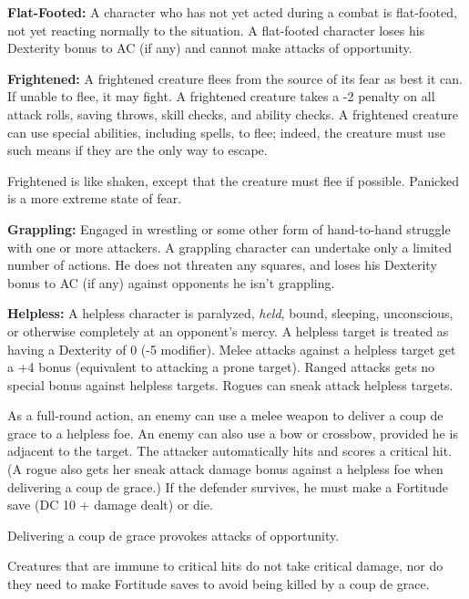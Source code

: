 \documentclass{article}
\begin{document}
\vspace{12pt}
\textbf{Flat-Footed:} A character who has not yet acted during a combat is flat-footed, 
not yet reacting normally to the situation. A flat-footed character loses his Dexterity 
bonus to AC (if any) and cannot make attacks of opportunity. 

\vspace{12pt}
\textbf{Frightened:} A frightened creature flees from the source of its fear as 
best it can. If unable to flee, it may fight. A frightened creature takes a -2 
penalty on all attack rolls, saving throws, skill checks, and ability checks. A 
frightened creature can use special abilities, including spells, to flee; indeed, 
the creature must use such means if they are the only way to escape. 

Frightened is like shaken, except that the creature must flee if possible. Panicked 
is a more extreme state of fear.

\vspace{12pt}
\textbf{Grappling:} Engaged in wrestling or some other form of hand-to-hand struggle 
with one or more attackers. A grappling character can undertake only a limited 
number of actions. He does not threaten any squares, and loses his Dexterity bonus 
to AC (if any) against opponents he isn't grappling.

\vspace{12pt}
\textbf{Helpless:} A helpless character is paralyzed, \textit{held}, bound, sleeping, 
unconscious, or otherwise completely at an opponent's mercy. A helpless target 
is treated as having a Dexterity of 0 (-5 modifier). Melee attacks against a helpless 
target get a +4 bonus (equivalent to attacking a prone target). Ranged attacks 
gets no special bonus against helpless targets. Rogues can sneak attack helpless 
targets. 

As a full-round action, an enemy can use a melee weapon to deliver a coup de grace 
to a helpless foe. An enemy can also use a bow or crossbow, provided he is adjacent 
to the target. The attacker automatically hits and scores a critical hit. (A rogue 
also gets her sneak attack damage bonus against a helpless foe when delivering 
a coup de grace.) If the defender survives, he must make a Fortitude save (DC 10 
+ damage dealt) or die. 

Delivering a coup de grace provokes attacks of opportunity. 

Creatures that are immune to critical hits do not take critical damage, nor do 
they need to make Fortitude saves to avoid being killed by a coup de grace.
\end{document}
